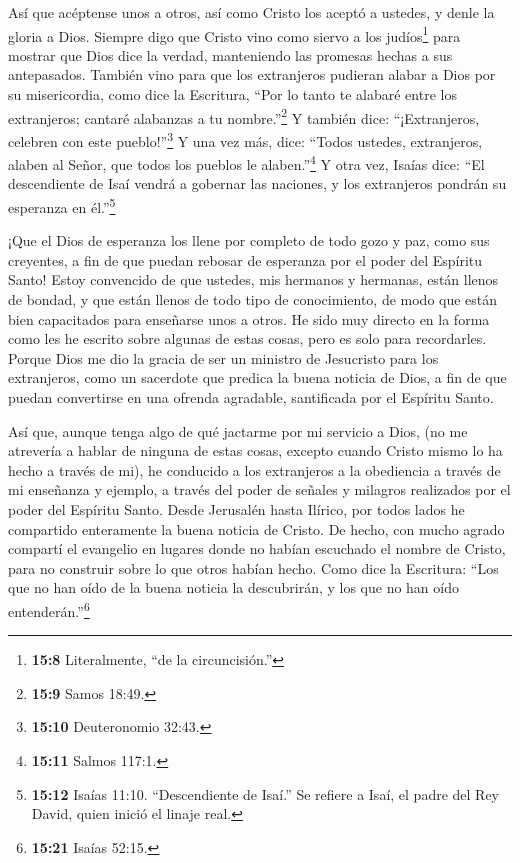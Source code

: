  Así que acéptense unos a otros, así como Cristo los aceptó
a ustedes, y denle la gloria a Dios.  Siempre digo que
Cristo vino como siervo a los judíos\footnote{\textbf{15:8}
  Literalmente, ``de la circuncisión.''} para mostrar que Dios dice la
verdad, manteniendo las promesas hechas a sus antepasados. 
También vino para que los extranjeros pudieran alabar a Dios por su
misericordia, como dice la Escritura, ``Por lo tanto te alabaré entre
los extranjeros; cantaré alabanzas a tu nombre.''\footnote{\textbf{15:9}
  Samos 18:49.}  Y también dice: ``¡Extranjeros, celebren
con este pueblo!''\footnote{\textbf{15:10} Deuteronomio 32:43.}
 Y una vez más, dice: ``Todos ustedes, extranjeros, alaben
al Señor, que todos los pueblos le alaben.''\footnote{\textbf{15:11}
  Salmos 117:1.}  Y otra vez, Isaías dice: ``El
descendiente de Isaí vendrá a gobernar las naciones, y los extranjeros
pondrán su esperanza en él.''\footnote{\textbf{15:12} Isaías 11:10.
  ``Descendiente de Isaí.'' Se refiere a Isaí, el padre del Rey David,
  quien inició el linaje real.}

 ¡Que el Dios de esperanza los llene por completo de todo
gozo y paz, como sus creyentes, a fin de que puedan rebosar de esperanza
por el poder del Espíritu Santo!  Estoy convencido de que
ustedes, mis hermanos y hermanas, están llenos de bondad, y que están
llenos de todo tipo de conocimiento, de modo que están bien capacitados
para enseñarse unos a otros.  He sido muy directo en la
forma como les he escrito sobre algunas de estas cosas, pero es solo
para recordarles. Porque Dios me dio la gracia  de ser un
ministro de Jesucristo para los extranjeros, como un sacerdote que
predica la buena noticia de Dios, a fin de que puedan convertirse en una
ofrenda agradable, santificada por el Espíritu Santo.

 Así que, aunque tenga algo de qué jactarme por mi servicio
a Dios,  (no me atrevería a hablar de ninguna de estas
cosas, excepto cuando Cristo mismo lo ha hecho a través de mi), he
conducido a los extranjeros a la obediencia a través de mi enseñanza y
ejemplo,  a través del poder de señales y milagros
realizados por el poder del Espíritu Santo. Desde Jerusalén hasta
Ilírico, por todos lados he compartido enteramente la buena noticia de
Cristo.  De hecho, con mucho agrado compartí el evangelio
en lugares donde no habían escuchado el nombre de Cristo, para no
construir sobre lo que otros habían hecho.  Como dice la
Escritura: ``Los que no han oído de la buena noticia la descubrirán, y
los que no han oído entenderán.''\footnote{\textbf{15:21} Isaías 52:15.}

